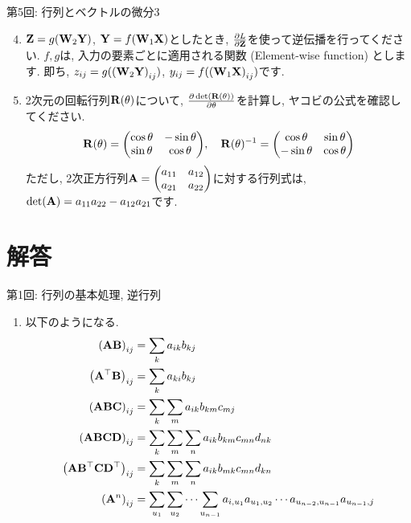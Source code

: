 \documentclass[dvipdfmx,notheorems,t]{beamer}
\begin{document}
\begin{frame}{第5回: 行列とベクトルの微分3}
\begin{enumerate}
  \setcounter{enumi}{3}
  \item $\vb{Z} = g(\vb{W}_2 \vb{Y})$, $\vb{Y} = f(\vb{W}_1 \vb{X})$としたとき,
  $\pdv{L}{\vb{Z}}$を使って逆伝播を行ってください.
  $f, g$は, 入力の要素ごとに適用される関数 (Element-wise function) とします.
  即ち, $z_{ij} = g(\left( \vb{W}_2 \vb{Y} \right)_{ij})$,
  $y_{ij} = f(\left( \vb{W}_1 \vb{X} \right)_{ij})$です.

  \item 2次元の回転行列$\vb{R}(\theta)$について, $\pdv{\det(\vb{R}(\theta))}{\theta}$を計算し,
  ヤコビの公式を確認してください.
  \begin{align*}
    \vb{R}(\theta) = \mqty(\cos \theta & -\sin \theta \\ \sin \theta & \cos \theta), \quad
    \vb{R}(\theta)^{-1} = \mqty(\cos \theta & \sin \theta \\ -\sin \theta & \cos \theta)
  \end{align*}
  ただし, 2次正方行列$\vb{A} = \mqty(a_{11} & a_{12} \\ a_{21} & a_{22})$に対する行列式は,
  $\det(\vb{A}) = a_{11} a_{22} - a_{12} a_{21}$です.
\end{enumerate}
\end{frame}

\begin{frame}{}
\end{frame}

\section{解答}

\begin{frame}{第1回: 行列の基本処理, 逆行列}
\begin{enumerate}
  \item 以下のようになる.
  \begin{align*}
    \left( \vb{A} \vb{B} \right)_{ij} &= \sum_k a_{ik} b_{kj} \\
    \left( \vb{A}^\top \vb{B} \right)_{ij} &= \sum_k a_{ki} b_{kj} \\
    \left( \vb{A} \vb{B} \vb{C} \right)_{ij} &= \sum_k \sum_m a_{ik} b_{km} c_{mj} \\
    \left( \vb{A} \vb{B} \vb{C} \vb{D} \right)_{ij}
      &= \sum_k \sum_m \sum_n a_{ik} b_{km} c_{mn} d_{nk} \\
    \left( \vb{A} \vb{B}^\top \vb{C} \vb{D}^\top \right)_{ij}
      &= \sum_k \sum_m \sum_n a_{ik} b_{mk} c_{mn} d_{kn} \\
    \left( \vb{A}^n \right)_{ij}
      &= \sum_{u_1} \sum_{u_2} \cdots \sum_{u_{n - 1}}
        a_{i, u_1} a_{u_1, u_2} \cdots a_{u_{n - 2}, u_{n - 1}} a_{u_{n - 1}, j}
  \end{align*}
\end{enumerate}
\end{frame}
\end{document}
